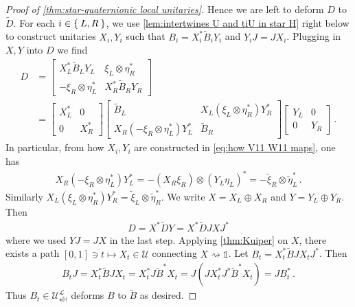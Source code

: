 \documentclass[a4paper,10pt]{article}
\numberwithin{equation}{section}
\theoremstyle{plain}
\theoremstyle{plain}
\theoremstyle{plain}
\theoremstyle{plain}
\theoremstyle{plain}
\theoremstyle{remark}
\theoremstyle{definition}
\theoremstyle{plain}
\newcommand{\calU}{\mathcal{U}}
\newcommand{\calL}{\mathcal{L}}
\newcommand{\ti}[1]{\widetilde{#1}}
\newcommand{\Id}{\mathds{1}}
\newcommand{\HH}{\mathbb{H}}
\newcommand{\eq}[1]{\begin{align*}#1\end{align*}}
\begin{document}
\begin{proof}[Proof of \cref{thm:star-quaternionic local unitaries}]
		Hence we are left to deform $D$ to $\ti D$. For each $i\in\Set{L,R}$, we use \cref{lem:intertwines U and tiU in star H} right below to construct unitaries $X_{i},Y_{i}$ such that $B_{i}=X_{i}^*\widetilde{B}_{i}Y_{i}$ and $Y_{i}J=JX_{i}$. Plugging in $X,Y$ into $D$ we find
		\eq{D &=\begin{bmatrix}X^*_{L}\widetilde{B}_{L}Y_{L} & \xi_L\otimes \eta_R^* \\ -\xi_R \otimes \eta_L^* & X_{R}^*\ti{B}_{R}Y_{R}\end{bmatrix} 
			\\ &= \begin{bmatrix}X_{L}^* & 0 \\ 0 & X_{R}^*\end{bmatrix}\begin{bmatrix}\widetilde{B}_{L} & X_{L} (\xi_L\otimes \eta_R^*)Y_{R}^* \\ X_{R}(-\xi_R \otimes \eta_L^*)Y_{L}^* & \ti{B}_{R}\end{bmatrix}\begin{bmatrix}Y_{L} & 0 \\ 0 & Y_{R}\end{bmatrix}\,.} 
		In particular, from how $X_i,Y_i$ are constructed in \cref{eq:how V11 W11 maps}, one has \eq{X_{R}(-\xi_R \otimes \eta_L^*)Y_{L}^* =-(X_{R}\xi_R) \otimes (Y_{L}\eta_L)^*= -\ti{\xi}_R\otimes \widetilde{\eta}_L^*\,.} 
		Similarly $X_{L} (\xi_L\otimes \eta_R^*)Y_{R}^*=\tilde{\xi}_L\otimes \widetilde{\eta}_R^*$. We write $X=X_{L}\oplus X_{R}$ and $Y=Y_{L}\oplus Y_{R}$. Then \eq{D=X^*\widetilde{D}Y=X^*\widetilde{D}JXJ^*} where we used $YJ=JX$ in the last step. 
		Applying \cref{thm:Kuiper} on $X$, there exists a path $[0,1]\ni t\mapsto X_t\in\calU$ connecting $X\rightsquigarrow\Id$. Let $B_t=X_t^*\widetilde{B}JX_tJ^*$. Then \eq{B_tJ=X_t^*\widetilde{B}JX_t=X_t^*J\widetilde{B}^*X_t= J(JX_t^*J^*\widetilde{B}^* X_t)=JB_t^*\,.} Thus $B_t\in\calU_{\star\HH}^\calL$ deforms $B$ to $\widetilde{B}$ as desired.
		
	\end{proof}
	
\end{document}
